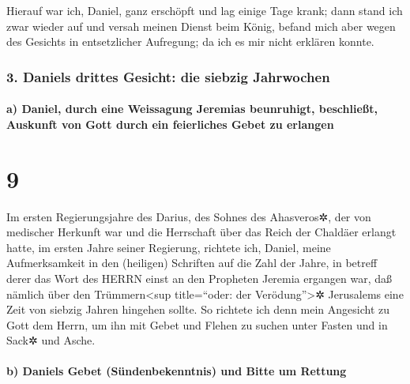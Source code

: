 Hierauf war ich, Daniel, ganz erschöpft und lag einige
Tage krank; dann stand ich zwar wieder auf und versah meinen Dienst beim
König, befand mich aber wegen des Gesichts in entsetzlicher Aufregung;
da ich es mir nicht erklären konnte.

\hypertarget{daniels-drittes-gesicht-die-siebzig-jahrwochen}{%
\subsubsection{3. Daniels drittes Gesicht: die siebzig
Jahrwochen}\label{daniels-drittes-gesicht-die-siebzig-jahrwochen}}

\hypertarget{a-daniel-durch-eine-weissagung-jeremias-beunruhigt-beschlieuxdft-auskunft-von-gott-durch-ein-feierliches-gebet-zu-erlangen}{%
\paragraph{a) Daniel, durch eine Weissagung Jeremias beunruhigt,
beschließt, Auskunft von Gott durch ein feierliches Gebet zu
erlangen}\label{a-daniel-durch-eine-weissagung-jeremias-beunruhigt-beschlieuxdft-auskunft-von-gott-durch-ein-feierliches-gebet-zu-erlangen}}

\hypertarget{section-8}{%
\section{9}\label{section-8}}

Im ersten Regierungsjahre des Darius, des Sohnes des
Ahasveros✲, der von medischer Herkunft war und die Herrschaft über das
Reich der Chaldäer erlangt hatte, im ersten Jahre seiner
Regierung, richtete ich, Daniel, meine Aufmerksamkeit in den (heiligen)
Schriften auf die Zahl der Jahre, in betreff derer das Wort des HERRN
einst an den Propheten Jeremia ergangen war, daß nämlich über den
Trümmern\textless sup title=``oder: der Verödung''\textgreater✲
Jerusalems eine Zeit von siebzig Jahren hingehen sollte.
So richtete ich denn mein Angesicht zu Gott dem Herrn, um
ihn mit Gebet und Flehen zu suchen unter Fasten und in Sack✲ und Asche.

\hypertarget{b-daniels-gebet-suxfcndenbekenntnis-und-bitte-um-rettung}{%
\paragraph{b) Daniels Gebet (Sündenbekenntnis) und Bitte um
Rettung}\label{b-daniels-gebet-suxfcndenbekenntnis-und-bitte-um-rettung}}

